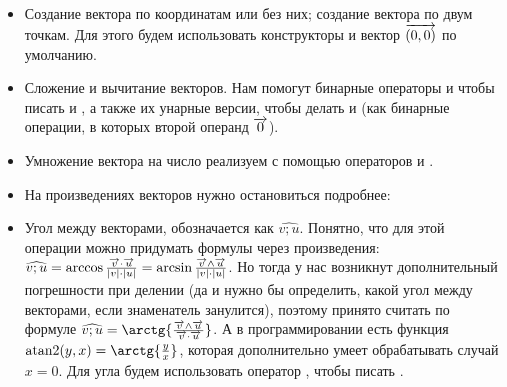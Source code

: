 \begin{itemize}
    \item Создание вектора по координатам или без них; создание вектора по двум точкам. Для этого будем использовать конструкторы и вектор $\overrightarrow{(0, 0)}$ по умолчанию.
    \item Сложение и вычитание векторов. Нам помогут бинарные операторы \lcpp{+} и \lcpp{-} чтобы писать  и , а также их унарные версии, чтобы делать  и  (как бинарные операции, в которых второй операнд $\overrightarrow{0}$).
    \item Умножение вектора на число реализуем с помощью операторов \lcpp{*} и \lcpp{/}.
    \item На произведениях векторов нужно остановиться подробнее:
    \item Угол между векторами, обозначается как $\widehat{v;u}$. Понятно, что для этой операции можно придумать формулы через произведения: $\widehat{v;u} = \arccos{ \frac{\overrightarrow{v} \cdot \overrightarrow{u}}{|v| \cdot |u|} } = \arcsin{ \frac{\overrightarrow{v} \wedge \overrightarrow{u}}{|v| \cdot |u|} }$. Но тогда у нас возникнут дополнительный погрешности при делении (да и нужно бы определить, какой угол между векторами, если знаменатель занулится), поэтому принято считать по формуле $\widehat{v;u} = \arctg{ \frac{\v{v} \wedge \v{u}}{\v{v} \cdot \v{u}} }$. А в программировании есть функция $\atantwo(y, x) = \arctg{\frac{y}{x}}$, которая дополнительно умеет обрабатывать случай $x = 0$. Для угла будем использовать оператор \lcpp{^}, чтобы писать .

\end{itemize}
